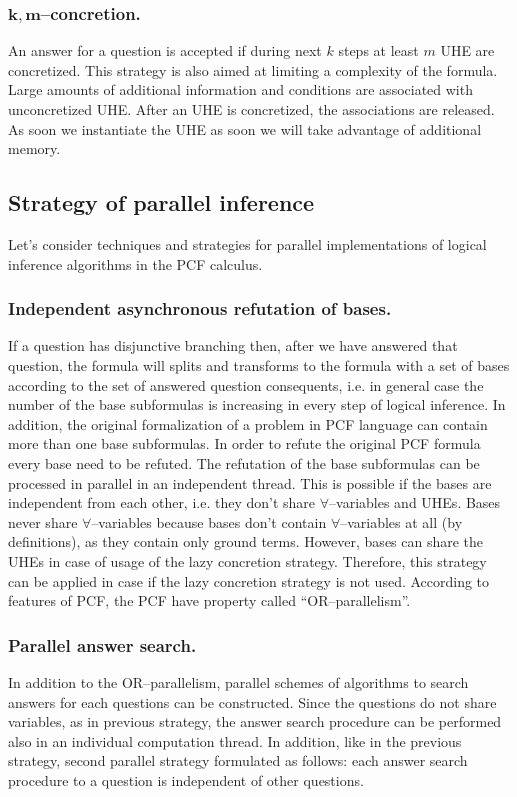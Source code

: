 \documentclass[runningheads,a4paper]{llncs}
\begin{document}
\subsubsection{$\boldsymbol{k,m}$--concretion.}
An answer for a question is accepted if during next $k$ steps at least $m$ UHE are concretized. This strategy is also aimed at limiting a complexity of the formula. Large amounts of additional information and conditions are associated with unconcretized UHE. After an UHE is concretized, the associations are released. As soon we instantiate the UHE as soon we will take advantage of additional memory.

\subsection{Strategy of parallel inference}

Let's consider techniques and strategies for parallel implementations of logical inference algorithms in the PCF calculus.

\subsubsection{Independent asynchronous refutation of bases.}
If a question has disjunctive branching then, after we have answered that question, the formula will splits and transforms to the formula with a set of bases according to the set of answered question consequents, i.e. in general case the number of the base subformulas is increasing in every step of logical inference. In addition, the original formalization of a problem in PCF language can contain more than one base subformulas. In order to refute the original PCF formula every base need to be refuted. The refutation of the base subformulas can be processed in parallel in an independent thread. This is possible if the bases are independent from each other, i.e. they don't share $\forall$--variables and UHEs. Bases never share $\forall$--variables because bases don't contain $\forall$--variables at all (by definitions), as they contain only ground terms. However, bases can share the UHEs in case of usage of the lazy concretion strategy. Therefore, this strategy can be applied in case if the lazy concretion strategy is not used. According to features of PCF, the PCF have property called ``OR--parallelism''.

\subsubsection{Parallel answer search.}
In addition to the OR--parallelism, parallel schemes of algorithms to search answers for each questions can be constructed. Since the questions do not share variables, as in previous strategy, the answer search procedure can be performed also in an individual computation thread. In addition, like in the previous strategy, second parallel strategy formulated as follows: each answer search procedure to a question is independent of other questions.
\end{document}
